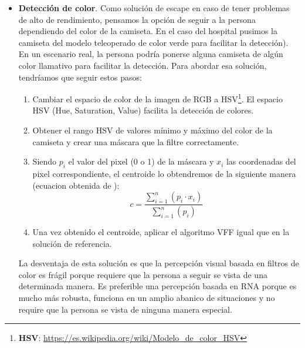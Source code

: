 \begin{itemize}
	\item \textbf{Detección de color}. Como solución de escape en caso de tener problemas de alto de rendimiento, pensamos la opción de seguir a la persona dependiendo del color de la camiseta. En el caso del hospital pusimos la camiseta del modelo teleoperado de color verde para facilitar la detección). En un escenario real, la persona podría ponerse alguna camiseta de algún color llamativo para facilitar la detección. Para abordar esa solución, tendríamos que seguir estos pasos:
	\begin{enumerate}
		\item Cambiar el espacio de color de la imagen de RGB a HSV\footnote{\textbf{HSV}: \url{https://es.wikipedia.org/wiki/Modelo_de_color_HSV}}. El espacio HSV (Hue, Saturation, Value) facilita la detección de colores.
		\item Obtener el rango HSV de valores mínimo y máximo del color de la camiseta y crear una máscara que la filtre correctamente.
		\item Siendo $p_{i}$ el valor del pixel (0 o 1) de la máscara y $x_i$ las coordenadas del pixel correspondiente, el centroide lo obtendremos de la siguiente manera (ecuacion obtenida de \cite{centroide_ecuacion}):
		\begin{equation*}
		c = \frac{\sum_{i=1}^n\left(p_i \cdot x_i\right)}{\sum_{i=1}^n\left(p_i\right)}
		\end{equation*}
		\item Una vez obtenido el centroide, aplicar el algoritmo VFF igual que en la solución de referencia.
	\end{enumerate}
	La desventaja de esta solución es que la percepción visual basada en filtros de color es frágil porque requiere que la persona a seguir se vista de una determinada manera. Es preferible una percepción basada en RNA porque es mucho más robusta, funciona en un amplio abanico de situaciones y no require que la persona se vista de ninguna manera especial.
\end{itemize}

